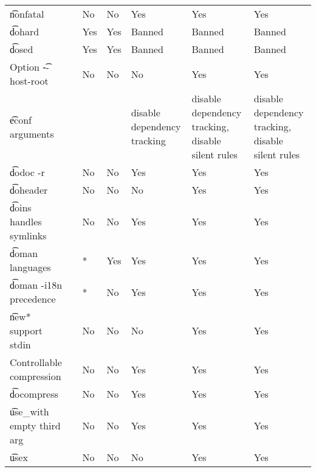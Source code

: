 \begin{landscape}
\begin{longtable}{llP{7.5em}P{7.5em}P{7.5em}P{7.5em}P{7.5em}}
\t{nonfatal} &  &
    No & No & Yes & Yes & Yes \\

\t{dohard} &  &
    Yes & Yes & Banned & Banned & Banned \\

\t{dosed} &  &
    Yes & Yes & Banned & Banned & Banned \\

Option \t{-{}-host-root} &  &
    No & No & No & Yes & Yes \\

\t{econf} arguments &  &
    &  & disable dependency tracking &
    disable dependency tracking, disable silent rules &
    disable dependency tracking, disable silent rules \\

\t{dodoc -r} &  &
    No & No & Yes & Yes & Yes \\

\t{doheader} &  &
    No & No & No & Yes & Yes \\

\t{doins} handles symlinks &  &
    No & No & Yes & Yes & Yes \\

\t{doman} languages &  &
    * & Yes & Yes & Yes & Yes \\

\t{doman -i18n} precedence &  &
    * & No & Yes & Yes & Yes \\

\t{new*} support stdin &  &
    No & No & No & Yes & Yes \\

Controllable compression &  &
    No & No & Yes & Yes & Yes \\

\t{docompress} &  &
    No & No & Yes & Yes & Yes \\

\t{use\_with} empty third arg &  &
    No & No & Yes & Yes & Yes \\

\t{usex} &  &
    No & No & No & Yes & Yes \\


\end{longtable}
\end{landscape}
